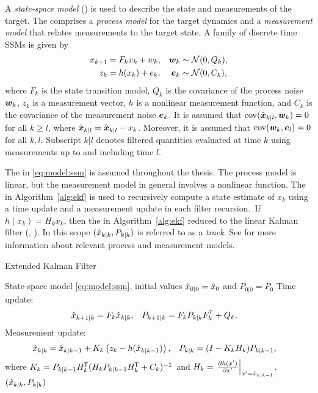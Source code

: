 A \emph{state-space model} (\abbrSSM) is used to describe the state and measurements of the target. The \abbrSSM comprises a \emph{process model} for the target dynamics and a \emph{measurement model} that relates measurements to the target state. A family of discrete time SSMs is given by
\begin{subequations} \label{eq:model:ssm}
\begin{align}
x_{k+1} &= F_kx_k + w_k, & \bm{w}_k &\sim\mathcal{N}(0,Q_k), \\
z_k &= h(x_k) + e_k, & \bm{e}_k &\sim\mathcal{N}(0,C_k),
\end{align}
\end{subequations}
where $F_k$ is the state transition model, $Q_k$ is the covariance of the process noise $\bm{w}_k$, $z_k$ is a measurement vector, $h$ is a nonlinear measurement function, and $C_k$ is the covariance of the measurement noise $\bm{e}_k$. It is assumed that $\operatorname*{\rm cov}(\tilde{\bm{x}}_{k|l},\bm{w}_k)=0$ for all $k\geq l$, where $\tilde{\bm{x}}_{k|l}=\hat{\bm{x}}_{k|l}-x_k$. Moreover, it is assumed that $\operatorname*{\rm cov}(\bm{w}_k,\bm{e}_l)=0$ for all $k,l$. Subscript $k|l$ denotes filtered quantities evaluated at time $k$ using measurements up to and including time $l$.

The \abbrSSM in \eqref{eq:model:ssm} is assumed throughout the thesis. The process model is linear, but the measurement model in general involves a nonlinear function. The \abbrEKF \cite{Jazwinski1970} in Algorithm~\ref{alg:ekf} is used to recursively compute a state estimate of $x_k$ using a time update and a measurement update in each filter recursion. If $h(x_k)=H_kx_k$, then the \abbrEKF in Algorithm~\ref{alg:ekf} reduced to the linear Kalman filter (\abbrKF, \cite{Kalman1960}). In this scope $(\hat{x}_{k|k},P_{k|k})$ is referred to as a \emph{track}. See \cite{Forsling2023Phd} for more information about relevant process and measurement models.

\begin{algorithm}[tb]
	\caption{Extended Kalman Filter}
	\label{alg:ekf}
	\begin{small}
	\begin{algorithmic}[0]
		\Input State-space model \eqref{eq:model:ssm}, initial values $\hat{x}_{0|0}=\hat{x}_0$ and $P_{0|0}=P_0$
		\State Time update:
		\begin{align}
			\hat{x}_{k+1|k} &= F_k\hat{x}_{k|k}, & P_{k+1|k} &= F_kP_{k|k} F_k^{\mkern-1.5mu\mathsf{T}} + Q_k.
		\end{align}
		\State Measurement update:
		\begin{align}
			\hat{x}_{k|k} &= \hat{x}_{k|k-1} + K_k\left(z_k-h(\hat{x}_{k|k-1})\right), & P_{k|k} &= (I-K_kH_k)P_{k|k-1},
		\end{align}		
		\State where $K_k = P_{k|k-1} H_k^{\mkern-1.5mu\mathsf{T}}(H_kP_{k|k-1} H_k^{\mkern-1.5mu\mathsf{T}}+C_k)^{-1}$ and $H_k = \left.\frac{\partial h(x')}{\partial x'}\right\vert_{x'=\hat{x}_{k|k-1}}$.
		\Output $(\hat{x}_{k|k},P_{k|k})$
	\end{algorithmic}
	\end{small}
\end{algorithm}


